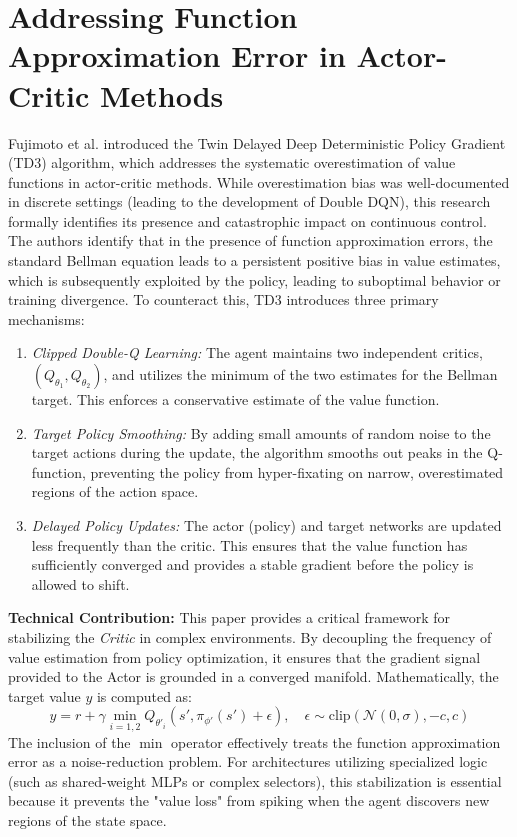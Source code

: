 \documentclass[a4paper]{scrartcl}
\begin{document}
\section{Addressing Function Approximation Error in Actor-Critic Methods}
Fujimoto et al. \cite{Fujimoto2018} introduced the Twin Delayed Deep Deterministic Policy Gradient (TD3) algorithm, which addresses the systematic overestimation of value functions in actor-critic methods. While overestimation bias was well-documented in discrete settings (leading to the development of Double DQN), this research formally identifies its presence and catastrophic impact on continuous control.
The authors identify that in the presence of function approximation errors, the standard Bellman equation leads to a persistent positive bias in value estimates, which is subsequently exploited by the policy, leading to suboptimal behavior or training divergence. To counteract this, TD3 introduces three primary mechanisms:
\begin{enumerate}
    \item \textit{Clipped Double-Q Learning:} The agent maintains two independent critics, $(Q_{\theta_1}, Q_{\theta_2})$, and utilizes the minimum of the two estimates for the Bellman target. This enforces a conservative estimate of the value function.
    \item \textit{Target Policy Smoothing:} By adding small amounts of random noise to the target actions during the update, the algorithm smooths out peaks in the Q-function, preventing the policy from hyper-fixating on narrow, overestimated regions of the action space.
    \item \textit{Delayed Policy Updates:} The actor (policy) and target networks are updated less frequently than the critic. This ensures that the value function has sufficiently converged and provides a stable gradient before the policy is allowed to shift.
\end{enumerate}
\textbf{Technical Contribution:} 
This paper provides a critical framework for stabilizing the \textit{Critic} in complex environments. By decoupling the frequency of value estimation from policy optimization, it ensures that the gradient signal provided to the Actor is grounded in a converged manifold. Mathematically, the target value $y$ is computed as:
\begin{equation}
y = r + \gamma \min_{i=1,2} Q_{\theta'_i}(s', \pi_{\phi'}(s') + \epsilon), \quad \epsilon \sim \text{clip}(\mathcal{N}(0, \sigma), -c, c)
\end{equation}
The inclusion of the $\min$ operator effectively treats the function approximation error as a noise-reduction problem. For architectures utilizing specialized logic (such as shared-weight MLPs or complex selectors), this stabilization is essential because it prevents the "value loss" from spiking when the agent discovers new regions of the state space.
\newpage
\end{document}
